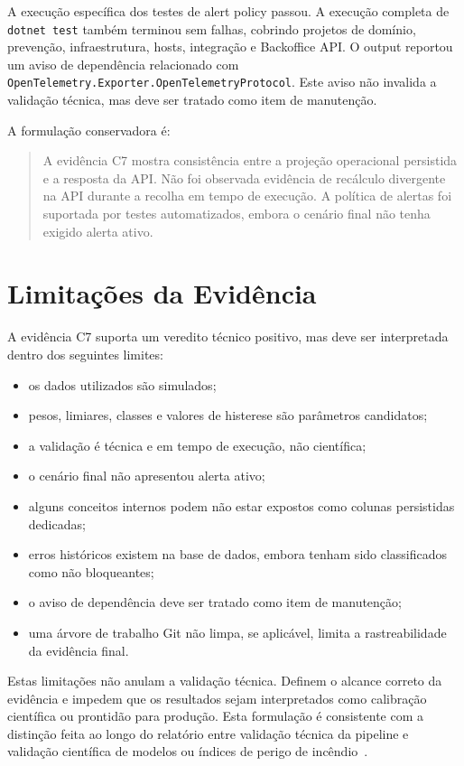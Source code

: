 A execução específica dos testes de alert policy passou. A execução completa de \texttt{dotnet test} também terminou sem falhas, cobrindo projetos de domínio, prevenção, infraestrutura, hosts, integração e Backoffice API. O output reportou um aviso de dependência relacionado com \texttt{OpenTelemetry.Exporter.OpenTelemetryProtocol}. Este aviso não invalida a validação técnica, mas deve ser tratado como item de manutenção.

A formulação conservadora é:

\begin{quote}
A evidência C7 mostra consistência entre a projeção operacional persistida e a resposta da API. Não foi observada evidência de recálculo divergente na API durante a recolha em tempo de execução. A política de alertas foi suportada por testes automatizados, embora o cenário final não tenha exigido alerta ativo.
\end{quote}

\section{Limitações da Evidência}

A evidência C7 suporta um veredito técnico positivo, mas deve ser interpretada dentro dos seguintes limites:

\begin{itemize}
    \item os dados utilizados são simulados;
    \item pesos, limiares, classes e valores de histerese são parâmetros candidatos;
    \item a validação é técnica e em tempo de execução, não científica;
    \item o cenário final não apresentou alerta ativo;
    \item alguns conceitos internos podem não estar expostos como colunas persistidas dedicadas;
    \item erros históricos existem na base de dados, embora tenham sido classificados como não bloqueantes;
    \item o aviso de dependência deve ser tratado como item de manutenção;
    \item uma árvore de trabalho Git não limpa, se aplicável, limita a rastreabilidade da evidência final.
\end{itemize}

Estas limitações não anulam a validação técnica. Definem o alcance correto da evidência e impedem que os resultados sejam interpretados como calibração científica ou prontidão para produção. Esta formulação é consistente com a distinção feita ao longo do relatório entre validação técnica da pipeline e validação científica de modelos ou índices de perigo de incêndio~\citep{nrcan_fwi_system,ipma_fwi,ec_jrc_effis}.

